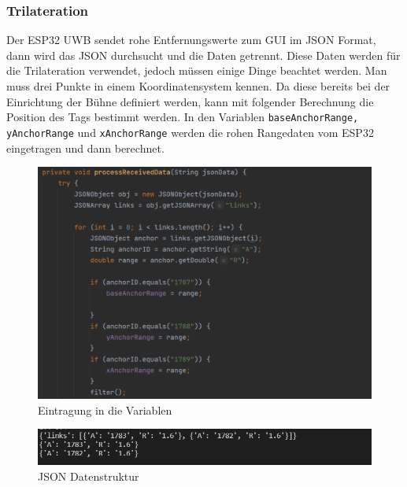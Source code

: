 \subsubsection{Trilateration}
\label{Trilateration}

Der ESP32 UWB sendet rohe Entfernungswerte zum GUI im JSON Format, dann wird das JSON durchsucht und die Daten getrennt. Diese Daten werden für die Trilateration verwendet, jedoch müssen einige Dinge beachtet werden. Man muss drei Punkte in einem Koordinatensystem kennen. Da diese bereits bei der Einrichtung der Bühne definiert werden, kann mit folgender Berechnung die Position des Tags bestimmt werden. In den Variablen \texttt{baseAnchorRange, yAnchorRange} und \texttt{xAnchorRange} werden die rohen Rangedaten vom ESP32 eingetragen und dann berechnet.

\begin{figure}[H]
	\centering
	\includegraphics[width=0.9\linewidth]{images/EintragungVariablen.png}
	\caption[EintragungVariablen]{Eintragung in die Variablen}
	\label{fig:Variableneintragung}
\end{figure}

\begin{figure}[H]
	\centering
	\includegraphics[width=0.9\linewidth]{images/JSONData.png}
	\caption[JSONData]{JSON Datenstruktur}
	\label{fig:JSONData}
\end{figure}


